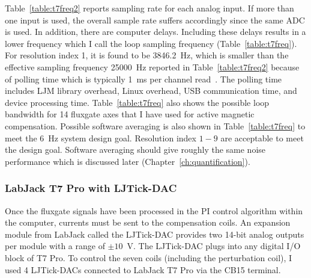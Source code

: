 
Table~\ref{table:t7freq2} reports sampling rate for each analog input. If more than one input is used, the overall sample rate suffers accordingly since the same ADC is used. In addition, there are computer delays. Including these delays results in a lower frequency which I call the loop sampling frequency (Table~\ref{table:t7freq}). For resolution index 1, it is found to be 3846.2~Hz, which is smaller than the effective sampling frequency 25000~Hz reported in Table~\ref{table:t7freq2} because of polling time which is typically 1~ms per channel read~\cite{T7}. The polling time includes LJM library overhead, Linux overhead, USB communication time, and device processing time. Table~\ref{table:t7freq} also shows the possible loop bandwidth for 14 fluxgate axes that I have used for active magnetic compensation. Possible software averaging is also shown in Table~\ref{table:t7freq} to meet the 6~Hz system design goal. Resolution index $1-9$ are acceptable to meet the design goal. Software averaging should give roughly the same noise performance which is discussed later (Chapter~\ref{ch:quantification}).

\subsubsection{LabJack T7 Pro with LJTick-DAC}
Once the fluxgate signals have been processed in the PI control algorithm within the computer, currents must be sent to the compensation coils. An expansion module from LabJack called the LJTick-DAC provides two 14-bit analog outputs per module with a range of $\pm10$~V. The LJTick-DAC plugs into any digital I/O block of T7 Pro. To control the seven coils (including the perturbation coil), I used 4 LJTick-DACs connected to LabJack T7 Pro via the CB15 terminal. 

